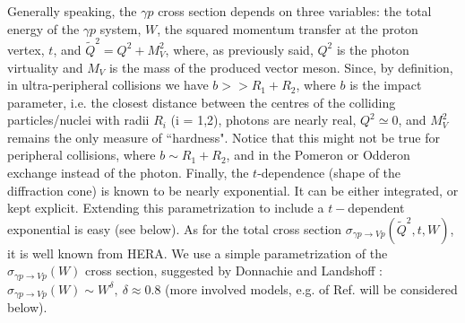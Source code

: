 \documentclass[12pt]{article}
\begin{document}
Generally speaking, the $\gamma p$ cross section depends on three variables: the total energy   of the $\gamma p$ system, $W$, 
the squared momentum transfer at the proton vertex, $t$, and $\widetilde Q^2=Q^2+M_V^2$, where, as previously said, $Q^2$ is the photon virtuality and $M_V$ is the mass of the produced vector meson. Since, by definition, in ultra-peripheral collisions we have $b>>R_1+R_2$, where $b$ is the impact parameter, i.e. the closest distance between the centres of the colliding particles/nuclei with radii  $R_i$ (i = 1,2),
photons are nearly real, $Q^2 \simeq 0$, and $M_V^2$ remains the only measure of  ``hardness". Notice that this might not be true for peripheral collisions, where $b\sim R_1+R_2$, and in the 
Pomeron or Odderon exchange instead of the photon. Finally, the $t$-dependence (shape of the diffraction cone) is known to be nearly exponential. It can be either integrated, or
kept explicit. Extending this parametrization to include a $t-$dependent exponential is easy (see below).
As for the total cross section $\sigma_{\gamma p\rightarrow Vp}(\widetilde Q^2, t, W)$, it is well known from HERA. 
We use a simple parametrization of the $\sigma_{\gamma p\rightarrow Vp}(W)$ cross section, 
suggested by Donnachie and Landshoff \cite{DL}: $\sigma_{\gamma p\rightarrow Vp}(W)\sim W^{\delta},\ \delta\approx 0.8$ (more involved models, e.g. of Ref. \cite{FFJS, Capua} will be considered below).
\end{document}

